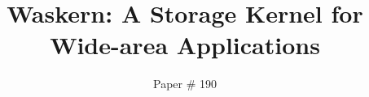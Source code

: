 \documentclass[10pt,twocolumn]{article}
\begin{document}
\title{\bf Waskern: A Storage Kernel for Wide-area Applications}
\author{Paper \# 190}
\date{}
\maketitle
\thispagestyle{empty}











 
\end{document}
